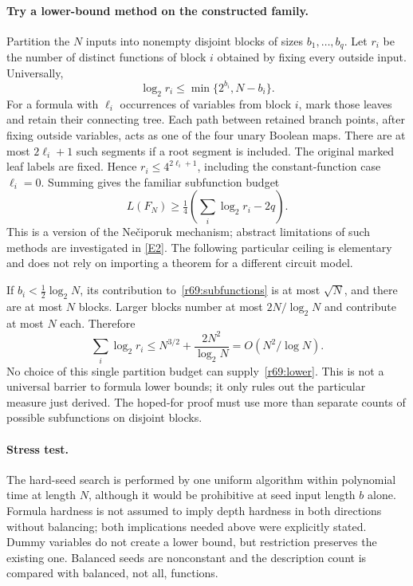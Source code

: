 \documentclass[11pt,a4paper]{article}
\newcommand{\eref}[2]{\hyperlink{extra:#1:#2}{[E#2]}}
\numberwithin{equation}{section}
\begin{document}
\paragraph{Try a lower-bound method on the constructed family.}
Partition the $N$ inputs into nonempty disjoint blocks of sizes $b_1,\ldots,b_q$. Let $r_i$ be the number of distinct functions of block $i$ obtained by fixing every outside input. Universally,
\begin{equation}\label{r69:subfunctions}
 \log_2r_i\le\min\{2^{b_i},N-b_i\}.
\end{equation}
For a formula with $\ell_i$ occurrences of variables from block $i$, mark those leaves and retain their connecting tree. Each path between retained branch points, after fixing outside variables, acts as one of the four unary Boolean maps. There are at most $2\ell_i+1$ such segments if a root segment is included. The original marked leaf labels are fixed. Hence $r_i\le4^{2\ell_i+1}$, including the constant-function case $\ell_i=0$. Summing gives the familiar subfunction budget
\[
 L(F_N)\ge\tfrac14\left(\sum_i\log_2r_i-2q\right).
\]
This is a version of the Nečiporuk mechanism; abstract limitations of such methods are investigated in \eref{statement}{2}. The following particular ceiling is elementary and does not rely on importing a theorem for a different circuit model.

If $b_i<\frac12\log_2N$, its contribution to~\eqref{r69:subfunctions} is at most $\sqrt N$, and there are at most $N$ blocks. Larger blocks number at most $2N/\log_2N$ and contribute at most $N$ each. Therefore
\[
 \sum_i\log_2r_i\le N^{3/2}+\frac{2N^2}{\log_2N}
       =O(N^2/\log N).
\]
No choice of this single partition budget can supply~\eqref{r69:lower}. This is not a universal barrier to formula lower bounds; it only rules out the particular measure just derived. The hoped-for proof must use more than separate counts of possible subfunctions on disjoint blocks.

\paragraph{Stress test.}
The hard-seed search is performed by one uniform algorithm within polynomial time at length $N$, although it would be prohibitive at seed input length $b$ alone. Formula hardness is not assumed to imply depth hardness in both directions without balancing; both implications needed above were explicitly stated. Dummy variables do not create a lower bound, but restriction preserves the existing one. Balanced seeds are nonconstant and the description count is compared with balanced, not all, functions.
\end{document}

